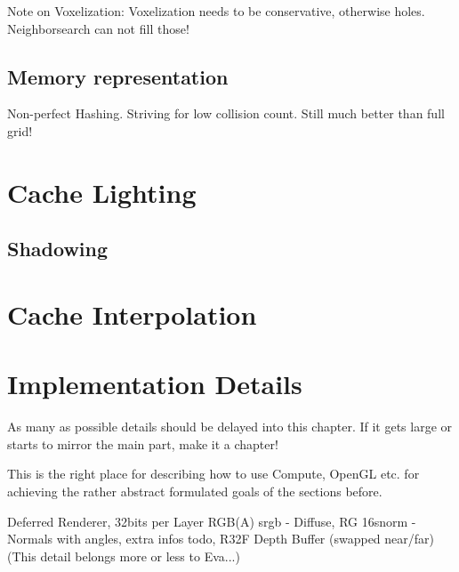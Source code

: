 \documentclass[thesis.tex]{subfiles}
\begin{document}
Note on Voxelization: Voxelization needs to be conservative, otherwise holes. Neighborsearch can not fill those!

\subsection{Memory representation}
Non-perfect Hashing. Striving for low collision count.
Still much better than full grid!

\section{Cache Lighting}

\subsection{Shadowing}

\section{Cache Interpolation}



\section{Implementation Details}

As many as possible details should be delayed into this chapter. If it gets large or starts to mirror the main part, make it a chapter!

This is the right place for describing how to use Compute, OpenGL etc. for achieving the rather abstract formulated goals of the sections before.

Deferred Renderer, 32bits per Layer RGB(A) srgb - Diffuse, RG 16snorm - Normals with angles, extra infos todo, R32F Depth Buffer (swapped near/far)\\
(This detail belongs more or less to Eva...)

\subfilebib %
\end{document}
